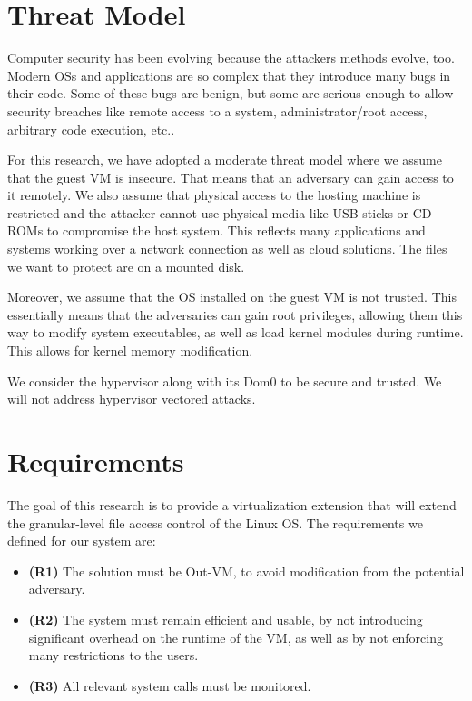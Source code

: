 \section{Threat Model}\label{sec:threat}

Computer security has been evolving because the attackers methods evolve, too. Modern \acp{OS} and applications are so complex that they introduce many bugs in their code. Some of these bugs are benign, but some are serious enough to allow security breaches like remote access to a system, administrator/root access, arbitrary code execution, etc..

\par For this research, we have adopted a moderate threat model where we assume that the guest \ac{VM} is insecure. That means that an adversary can gain access to it remotely. We also assume that physical access to the hosting machine is restricted and the attacker cannot use physical media like USB sticks or CD-ROMs to compromise the host system. This reflects many applications and systems working over a network connection as well as cloud solutions. The files we want to protect are on a mounted disk.

\par Moreover, we assume that the \ac{OS} installed on the guest \ac{VM} is not trusted. This essentially means that the adversaries can gain root privileges, allowing them this way to modify system executables, as well as load kernel modules during runtime. This allows for kernel memory modification.

\par We consider the hypervisor along with its Dom0 to be secure and trusted. We will not address hypervisor vectored attacks.

\section{Requirements}\label{sec:requirements}
The goal of this research is to provide a virtualization extension that will extend the granular-level file access control of the Linux \ac{OS}. The requirements we defined for our system are:
\begin{itemize}
	\item \textbf{(R1)} The solution must be Out-VM, to avoid modification from the potential adversary. 
	\item \textbf{(R2)} The system must remain efficient and usable, by not introducing significant overhead on the runtime of the \ac{VM}, as well as by not enforcing many restrictions to the users. 
	\item \textbf{(R3)} All relevant system calls must be monitored.
\end{itemize}


